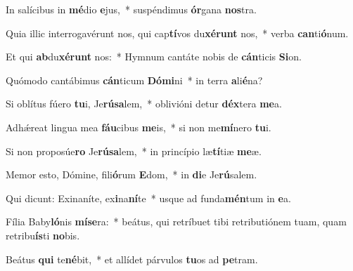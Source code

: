 \item In salícibus in \textbf{mé}dio \textbf{e}jus,~* suspéndimus \textbf{ór}gana \textbf{nos}tra.
\item Quia illic interrogavérunt nos, qui cap\textbf{tí}vos du\textbf{xé}\textbf{runt} nos,~* verba \textbf{can}ti\textbf{ó}num.
\item Et qui \textbf{ab}du\textbf{xé}\textbf{runt} nos:~* Hymnum cantáte nobis de \textbf{cán}ticis \textbf{Si}on.
\item Quómodo cantábimus \textbf{cán}ticum \textbf{Dó}\textbf{mi}ni~* in terra \textbf{a}li\textbf{é}na?
\item Si oblítus fúero \textbf{tu}i, Je\textbf{rú}\textbf{sa}lem,~* oblivióni detur \textbf{déx}tera \textbf{me}a.
\item Adhǽreat lingua mea \textbf{fáu}cibus \textbf{me}is,~* si non me\textbf{mí}nero \textbf{tu}i.
\item Si non proposúe\textbf{ro} Je\textbf{rú}\textbf{sa}lem,~* in princípio læ\textbf{tí}tiæ \textbf{me}æ.
\item Memor esto, Dómine, fili\textbf{ó}rum \textbf{E}dom,~* in \textbf{di}e Je\textbf{rú}salem.
\item Qui dicunt: Exinaníte, ex\textbf{i}na\textbf{ní}te~* usque ad funda\textbf{mén}tum in \textbf{e}a.
\item Fília Baby\textbf{ló}nis \textbf{mí}\textbf{se}ra:~* beátus, qui retríbuet tibi retributiónem tuam, quam retribu\textbf{ís}ti \textbf{no}bis.
\item Beátus \textbf{qui} te\textbf{né}bit,~* et allídet párvulos \textbf{tu}os ad \textbf{pe}tram.
